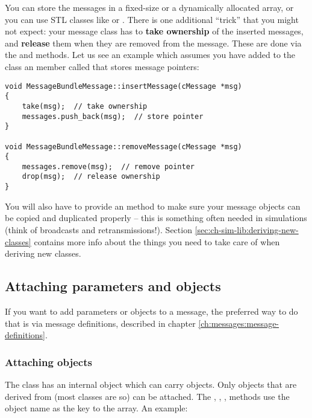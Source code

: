 You can store the messages in a fixed-size or a dynamically allocated
array, or you can use STL classes like  or .
There is one additional ``trick'' that you might not expect: your message
class has to \textbf{take ownership} of the inserted messages, and
\textbf{release} them when they are removed from the message. These are
done via the  and  methods. Let us see
an example which assumes you have added to the class an  member
called  that stores message pointers:

\begin{verbatim}
void MessageBundleMessage::insertMessage(cMessage *msg)
{
    take(msg);  // take ownership
    messages.push_back(msg);  // store pointer
}

void MessageBundleMessage::removeMessage(cMessage *msg)
{
    messages.remove(msg);  // remove pointer
    drop(msg);  // release ownership
}
\end{verbatim}

You will also have to provide an  method to
make sure your message objects can be copied and duplicated
properly -- this is something often needed in simulations
(think of broadcasts and retransmissions!). Section
\ref{sec:ch-sim-lib:deriving-new-classes} contains more info
about the things you need to take care of when deriving new classes.



\subsection{Attaching parameters and objects}

If you want to add parameters or objects to a message, the preferred
way to do that is via message definitions, described in chapter
\ref{ch:messages:message-definitions}.


\subsubsection{Attaching objects}

The  class has an internal  object which can
carry objects. Only objects
that are derived from  (most {\opp} classes are so) can be attached.
The , , ,
 methods use the object name
as the key to the array. An example:

